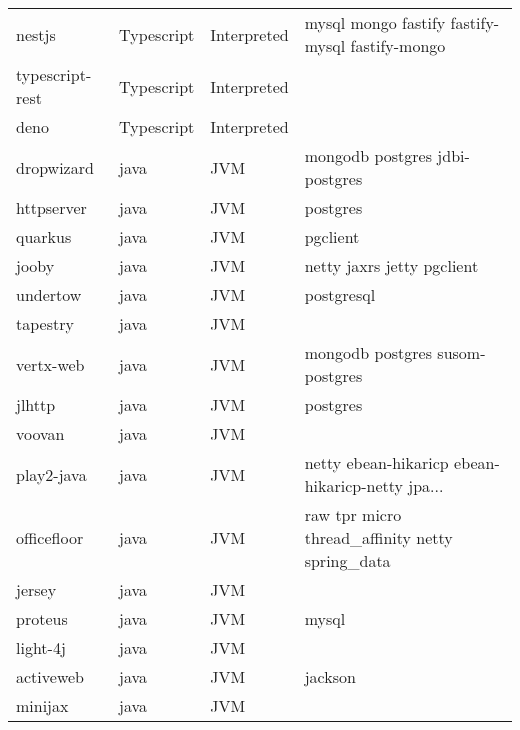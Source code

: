 \begin{longtable}{llll}
    nestjs           & Typescript & Interpreted  & mysql mongo fastify fastify-mysql fastify-mongo    \\
    typescript-rest  & Typescript & Interpreted  &                                                    \\
    deno             & Typescript & Interpreted  &                                                    \\
    dropwizard       & java & JVM       & mongodb postgres jdbi-postgres                     \\
    httpserver       & java & JVM       & postgres                                           \\
    quarkus          & java & JVM       & pgclient                                           \\
    jooby            & java & JVM       & netty jaxrs jetty pgclient                         \\
    undertow         & java & JVM       & postgresql                                         \\
    tapestry         & java & JVM       &                                                    \\
    vertx-web        & java & JVM       & mongodb postgres susom-postgres                    \\
    jlhttp           & java & JVM       & postgres                                           \\
    voovan           & java & JVM       &                                                    \\
    play2-java       & java & JVM       & netty ebean-hikaricp ebean-hikaricp-netty jpa...   \\
    officefloor      & java & JVM       & raw tpr micro thread\_affinity netty spring\_data  \\
    jersey           & java & JVM       &                                                    \\
    proteus          & java & JVM       & mysql                                              \\
    light-4j         & java & JVM       &                                                    \\
    activeweb        & java & JVM       & jackson                                            \\
    minijax          & java & JVM       &                                                    \\

\end{longtable}

